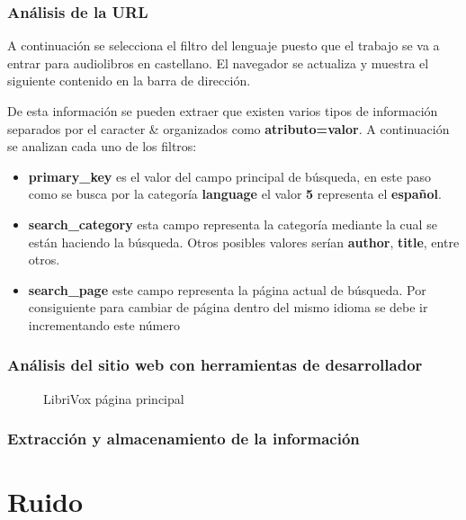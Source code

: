 \subsubsection{Análisis de la \acrshort{URL}}
A continuación se selecciona el filtro del lenguaje puesto que el trabajo se va a entrar para audiolibros en castellano. El navegador se actualiza y muestra el siguiente contenido en la barra de dirección.
\begin{center}
\end{center}
De esta información se pueden extraer que existen varios tipos de información separados por el caracter \& organizados como \textbf{atributo=valor}. A continuación se analizan cada uno de los filtros:
\begin{itemize}
	\item \textbf{primary\_key} es el valor del campo principal de búsqueda, en este paso como se busca por la categoría \textbf{language} el valor \textbf{5} representa el \textbf{español}.
	\item \textbf{search\_category} esta campo representa la categoría mediante la cual se están haciendo la búsqueda. Otros posibles valores serían \textbf{author}, \textbf{title}, entre otros.
	\item \textbf{search\_page} este campo representa la página actual de búsqueda. Por consiguiente para cambiar de página dentro del mismo idioma se debe ir incrementando este número
\end{itemize}
\subsubsection{Análisis del sitio web con herramientas de desarrollador}
\begin{figure}[ht!]
	\centering
	\caption{LibriVox página principal}
	\label{fig: librivox_inspect}
\end{figure}
\subsubsection{Extracción y almacenamiento de la información}

\section{Ruido}
